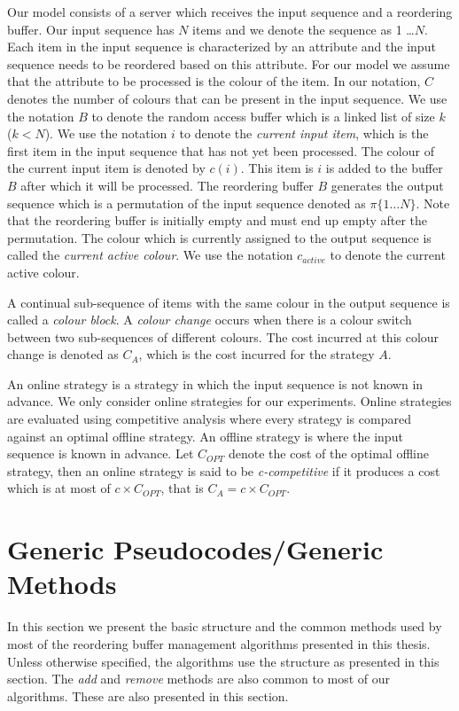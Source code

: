 Our model consists of a server which receives the input sequence and a reordering buffer. Our input sequence has $N$ items and we denote the sequence as 1 \ldots $N$. Each item in the input sequence is characterized by an attribute and the input sequence needs to be reordered based on this attribute. For our model we assume that the attribute to be processed is the colour of the item. In our notation, $C$ denotes the number of colours that can be present in the input sequence. We use the notation $B$ to denote the
random access buffer which is a linked list of size $k$ ($k < N$). We use the notation $i$ to denote the \textit{current input item}, which is the first item in the input sequence that has not yet been processed. The colour of the current input item is denoted by $c(i)$. This item is $i$ is added to the buffer $B$ after which it will be processed. The reordering buffer $B$ generates the output sequence which is a permutation of the input sequence denoted as $\pi\{1 \ldots N\}$. Note that the reordering buffer is initially empty and must end up empty after the
permutation. The colour which is currently assigned to the output sequence is called the \textit{current active colour}. We use the notation $c_{active}$ to denote the current active colour. 

A continual sub-sequence of items with the same colour in the output sequence is
called a \textit{colour block}. A \textit{colour change} occurs when there is a
colour switch between two sub-sequences of different colours. The cost incurred at this
colour change is denoted as $C_A$, which is the cost incurred for the
strategy $A$. 

An online strategy is a strategy in which the input sequence is not known in
advance. We only consider online strategies for our experiments. Online strategies are
evaluated using competitive analysis where every strategy is compared against an optimal
offline strategy. An offline strategy is where the input sequence is known in advance. Let $C_{OPT}$ denote the cost of the optimal offline
strategy, then an online strategy is said to be \textit{c-competitive} if it
produces a cost which is at most of $c \times C_{OPT}$, that is $C_A = c \times C_{OPT}$.

\section{Generic Pseudocodes/Generic Methods} \label{genPseudocodes}

In this section we present the basic structure and the common methods used by most of the reordering buffer management algorithms presented in this thesis. Unless otherwise specified, the algorithms use the structure as presented in this section. The \textit{add} and \textit{remove} methods are also common to most of our algorithms. These are also presented in this section. 

